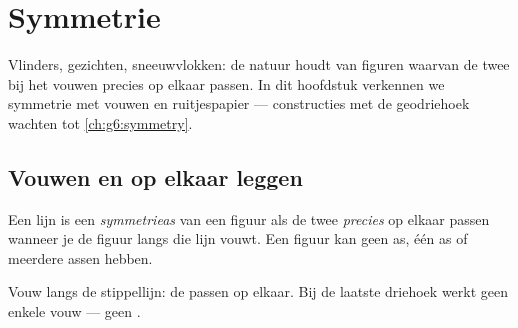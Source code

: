 \chapter{Symmetrie}\label{ch:g4:symmetry}

Vlinders, gezichten, sneeuwvlokken: de natuur houdt van figuren waarvan de
twee  bij het vouwen precies op elkaar passen. In dit hoofdstuk
verkennen we symmetrie met vouwen en ruitjespapier --- constructies met de
geodriehoek wachten tot \cref{ch:g6:symmetry}.

\section{Vouwen en op elkaar leggen}

\begin{definition}[Symmetrieas]\label{def:g4:symmetry:def}
Een lijn is een \emph{symmetrieas} van een figuur als de
twee  \emph{precies} op elkaar passen wanneer je de figuur langs die
lijn vouwt. Een figuur kan geen as, één as of meerdere assen hebben.
\end{definition}

\begin{omfigure}

{\small Vouw langs de stippellijn: de  passen op elkaar. Bij de
laatste driehoek werkt geen enkele vouw --- geen .}
\end{omfigure}

